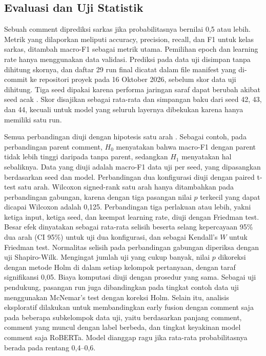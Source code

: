 \documentclass[conference]{IEEEtran}
\begin{document}
\subsection{Evaluasi dan Uji Statistik}
\label{sec:eval}
Sebuah comment diprediksi sarkas jika probabilitasnya bernilai 0,5 atau lebih. Metrik yang dilaporkan meliputi accuracy, precision, recall, dan F1 untuk kelas sarkas, ditambah macro-F1 sebagai metrik utama. Pemilihan epoch dan learning rate hanya menggunakan data validasi. Prediksi pada data uji disimpan tanpa dihitung skornya, dan daftar 29 run final dicatat dalam file manifest yang di-commit ke repositori proyek pada 16 Oktober 2026, sebelum skor data uji dihitung. Tiga seed dipakai karena performa jaringan saraf dapat berubah akibat seed acak \cite{ulmer2022deep}. Skor disajikan sebagai rata-rata dan simpangan baku dari seed 42, 43, dan 44, kecuali untuk model yang seluruh layernya dibekukan karena hanya memiliki satu run.

Semua perbandingan diuji dengan hipotesis satu arah \cite{dror2020significance}. Sebagai contoh, pada perbandingan parent comment, $H_0$ menyatakan bahwa macro-F1 dengan parent tidak lebih tinggi daripada tanpa parent, sedangkan $H_1$ menyatakan hal sebaliknya. Data yang diuji adalah macro-F1 data uji per seed, yang dipasangkan berdasarkan seed dan model. Perbandingan dua konfigurasi diuji dengan paired t-test satu arah. Wilcoxon signed-rank satu arah hanya ditambahkan pada perbandingan gabungan, karena dengan tiga pasangan nilai $p$ terkecil yang dapat dicapai Wilcoxon adalah 0,125. Perbandingan tiga perlakuan atau lebih, yakni ketiga input, ketiga seed, dan keempat learning rate, diuji dengan Friedman test. Besar efek dinyatakan sebagai rata-rata selisih beserta selang kepercayaan 95\% dua arah (CI 95\%) untuk uji dua konfigurasi, dan sebagai Kendall's $W$ untuk Friedman test. Normalitas selisih pada perbandingan gabungan diperiksa dengan uji Shapiro-Wilk. Mengingat jumlah uji yang cukup banyak, nilai $p$ dikoreksi dengan metode Holm di dalam setiap kelompok pertanyaan, dengan taraf signifikansi 0,05. Biaya komputasi diuji dengan prosedur yang sama. Sebagai uji pendukung, pasangan run juga dibandingkan pada tingkat contoh data uji menggunakan McNemar's test dengan koreksi Holm. Selain itu, analisis eksploratif dilakukan untuk membandingkan early fusion dengan comment saja pada beberapa subkelompok data uji, yaitu berdasarkan panjang comment, comment yang muncul dengan label berbeda, dan tingkat keyakinan model comment saja RoBERTa. Model dianggap ragu jika rata-rata probabilitasnya berada pada rentang 0,4--0,6.
\end{document}
